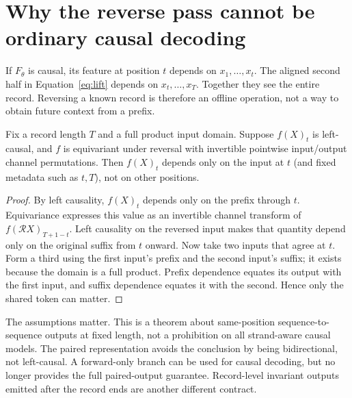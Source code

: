 \section{Why the reverse pass cannot be ordinary causal decoding}

If $F_\theta$ is causal, its feature at position $t$ depends on $x_1,\ldots,x_t$.
The aligned second half in Equation~\ref{eq:lift} depends on
$x_t,\ldots,x_T$. Together they see the entire record. Reversing a known
record is therefore an offline operation, not a way to obtain future context
from a prefix.


\begin{proposition}
Fix a record length $T$ and a full product input domain. Suppose
$f(X)_t$ is left-causal, and $f$ is equivariant under reversal with invertible
pointwise input/output channel permutations. Then $f(X)_t$ depends only on
the input at $t$ (and fixed metadata such as $t,T$), not on other positions.
\end{proposition}
\begin{proof}
By left causality, $f(X)_t$ depends only on the prefix through $t$.
Equivariance expresses this value as an invertible channel transform of
$f(\mathcal RX)_{T+1-t}$. Left causality on the reversed input makes that
quantity depend only on the original suffix from $t$ onward. Now take two
inputs that agree at $t$. Form a third using the first input's prefix and
the second input's suffix; it exists because the domain is a full product.
Prefix dependence equates its output with the first input, and suffix
dependence equates it with the second. Hence only the shared token can matter.
\end{proof}

The assumptions matter. This is a theorem about same-position
sequence-to-sequence outputs at fixed length, not a prohibition on all
strand-aware causal models. The paired representation avoids the conclusion
by being bidirectional, not left-causal. A forward-only branch can be used for
causal decoding, but no longer provides the full paired-output guarantee.
Record-level invariant outputs emitted after the record ends are another
different contract.

